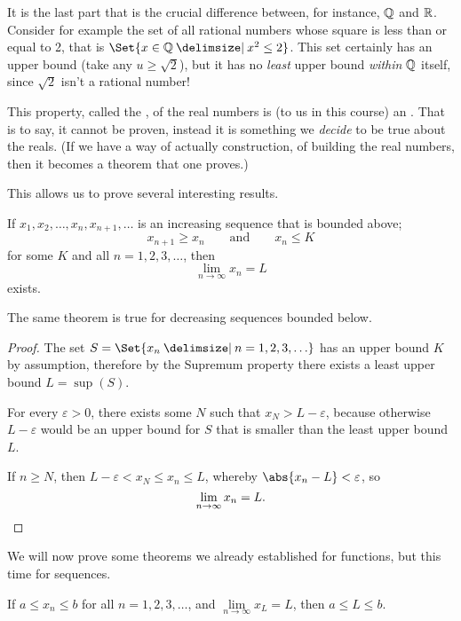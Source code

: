 \noindent
It is the last part that is the crucial difference between, for instance, $\mathbb{Q}$ and $\mathbb{R}$.
Consider for example the set of all rational numbers whose square is less than or equal to 2, that is $\Set{x \in \Q \given x^2 \leq 2}$.
This set certainly has an upper bound (take any $u \geq \sqrt{2}$), but it has no \emph{least} upper bound \emph{within} $\mathbb{Q}$ itself, since $\sqrt{2}$ isn't a rational number!

This property, called the , of the real numbers is (to us in this course) an .
That is to say, it cannot be proven, instead it is something we \emph{decide} to be true about the reals.
(If we have a way of actually construction, of building the real numbers, then it becomes a theorem that one proves.)

This allows us to prove several interesting results.

\begin{theorem}
	If $x_1, x_2, \ldots, x_n, x_{n + 1}, \ldots$ is an increasing sequence that is bounded above;
	\[
		x_{n + 1} \geq x_n \qquad \text{and} \qquad x_n \leq K
	\]
	for some $K$ and all $n = 1, 2, 3, \ldots$, then
	\[
		\lim_{n \to \infty} x_n = L
	\]
	exists.
\end{theorem}

\noindent
The same theorem is true for decreasing sequences bounded below.

\begin{proof}
	The set $S = \Set{x_n \given n = 1, 2, 3, \ldots}$ has an upper bound $K$ by assumption, therefore by the Supremum property there exists a least upper bound $L = \sup(S)$.

	For every $\varepsilon > 0$, there exists some $N$ such that $x_N > L - \varepsilon$, because otherwise $L - \varepsilon$ would be an upper bound for $S$ that is smaller than the least upper bound $L$.

	If $n \geq N$, then $L - \varepsilon < x_N \leq x_n \leq L$, whereby $\abs{x_n - L} < \varepsilon$, so
	\[
		\lim_{n \to \infty} x_n = L. \qedhere
	\]
\end{proof}

\noindent
We will now prove some theorems we already established for functions, but this time for sequences.

\begin{theorem}\label{lec8:seqbound}
	If $a \leq x_n \leq b$ for all $n = 1, 2, 3, \ldots$, and $\lim\limits_{n \to \infty} x_L = L$, then $a \leq L \leq b$.
\end{theorem}

